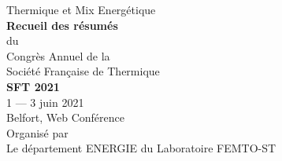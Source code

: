 \begin{titlepage}
\center\scshape

\LARGE

Thermique et Mix Energétique\\
%
%
%
{\Huge\bfseries
Recueil des résumés\\
%
}
\vspace{1em}
%
du\\
%
\vspace{1em}
%
{\Huge
Congrès Annuel de la\\
Société Française de Thermique\\
}
%
%
{\Huge\bfseries SFT 2021}\\
%
%
1\ier{} --- 3 juin 2021\\Belfort, Web Conférence\\
%
%
\large
Organisé par\\
%
\vspace{1em}
%
\normalsize
Le département ENERGIE du Laboratoire FEMTO-ST
%
\end{titlepage}
